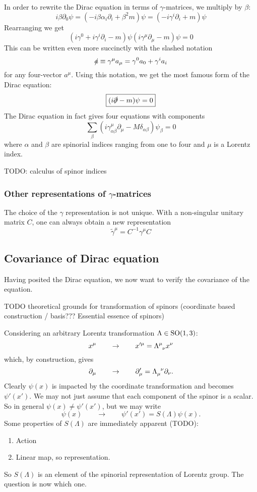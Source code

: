 In order to rewrite the Dirac equation in terms of $\gamma$-matrices, we multiply by $\beta$:
\[ i\beta\partial_0 \psi = \left(-i\beta\alpha_i\partial_i + \beta^2 m\right)\psi = \left(-i\gamma^i\partial_i + m\right)\psi \]
Rearranging we get
\[ \left( i\gamma^0 + i\gamma^i\partial_i -m \right)\psi \left(i\gamma^\mu\partial_\mu - m\right)\psi = 0 \]
This can be written even more succinctly with the slashed notation
\[ \slashed{a} \equiv \gamma^\mu a_\mu = \gamma^0a_0 + \gamma^i a_i \]
 for any four-vector $a^\mu$.
Using this notation, we get the most famous form of the Dirac equation:
\[ \boxed{(i\slashed{\partial} - m ) \psi = 0}\]
The Dirac equation in fact gives four equations with components
\[ \sum_\beta\left(i\gamma^\mu_{\alpha\beta}\partial_\mu - M\delta_{\alpha\beta}\right)\psi_\beta = 0 \]
where $\alpha$ and $\beta$ are spinorial indices ranging from one to four and $\mu$ is a Lorentz index.

TODO: calculus of spinor indices

\subsubsection{Other representations of $\gamma$-matrices}
The choice of the $\gamma$ representation is not unique. With a non-singular unitary matrix $C$, one can always obtain a new representation
\[ \tilde{\gamma}^\mu = C^{-1}\gamma^\mu C \]

\subsection{Covariance of Dirac equation}
Having posited the Dirac equation, we now want to verify the covariance of the equation.  

TODO theoretical grounds for transformation of spinors (coordinate based construction / basis??? Essential essence of spinors)

Considering an arbitrary Lorentz transformation $\Lambda \in \operatorname{SO}(1,3)$:
\[ x^{\mu} \qquad\to\qquad x'^\mu = \tensor{\Lambda}{^\mu_\nu} x^\nu \]
which, by construction, gives
\[ \partial_\mu \qquad\to\qquad \partial'_\mu = \tensor{\Lambda}{_\mu^\nu}\partial_\nu. \]
Clearly $\psi(x)$ is impacted by the coordinate transformation and becomes $\psi'(x')$. We may not just assume that each component of the spinor is a scalar. So in general $\psi(x) \neq \psi'(x')$, but we may write
\[ \psi(x) \qquad\to\qquad \psi'(x') = S(\Lambda)\psi(x). \]
Some properties of $S(\Lambda)$ are immediately apparent (TODO):
\begin{enumerate}
\item Action
\item Linear map, so representation.
\end{enumerate}
So $S(\Lambda)$ is an element of the spinorial representation of Lorentz group. The question is now which one.

